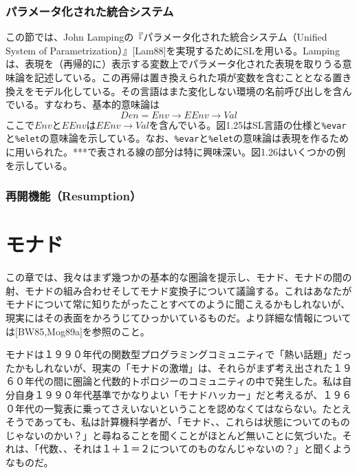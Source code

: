 \documentclass[11pt, oneside]{jsbook}   	%
\begin{document}




\subsection{パラメータ化された統合システム}
この節では、John Lampingの『パラメータ化された統合システム（Unified System of Parametrization）』[Lam88]を実現するためにSLを用いる。Lampingは、表現を（再帰的に）表示する変数上でパラメータ化された表現を取りうる意味論を記述している。この再帰は置き換えられた項が変数を含むこととなる置き換えをモデル化している。その言語はまた変化しない環境の名前呼び出しを含んでいる。すなわち、基本的意味論は
$$
Den = Env \rightarrow EEnv \rightarrow Val
$$
ここで$Env$と$EEnv$は$EEnv \rightarrow Val$を含んでいる。図1.25はSL言語の仕様と\verb|%evar|と\verb|%elet|の意味論を示している。なお、\verb|%evar|と\verb|%elet|の意味論は表現を作るために用いられた。***で表される線の部分は特に興味深い。図1.26はいくつかの例を示している。
\subsection{再開機能（Resumption）}







\newpage
\chapter{モナド}
この章では、我々はまず幾つかの基本的な圏論を提示し、モナド、モナドの間の射、モナドの組み合わせそしてモナド変換子について議論する。これはあなたがモナドについて常に知りたがったことすべてのように聞こえるかもしれないが、現実にはその表面をかろうじてひっかいているものだ。より詳細な情報については[BW85,Mog89a]を参照のこと。

モナドは１９９０年代の関数型プログラミングコミュニティで「熱い話題」だったかもしれないが、現実の「モナドの激増」は、それらがまず考え出された１９６０年代の間に圏論と代数的トポロジーのコミュニティの中で発生した。私は自分自身１９９０年代基準でかなりよい「モナドハッカー」だと考えるが、１９６０年代の一覧表に乗ってさえいないということを認めなくてはならない。たとえそうであっても、私は計算機科学者が、「モナド、、これらは状態についてのものじゃないのかい？」と尋ねることを聞くことがほとんど無いことに気づいた。それは、「代数、、それは１＋１＝２についてのものなんじゃないの？」と聞くようなものだ。
\end{document}
